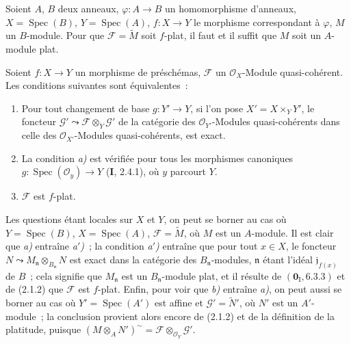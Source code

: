\begin{proposition}[2.1.2]
\label{IV.2.1.2-fr}
Soient $A$, $B$ deux anneaux, $\varphi:A\to B$ un homomorphisme d'anneaux,
$X=\operatorname{Spec}(B)$, $Y=\operatorname{Spec}(A)$, $f:X\to Y$ le
morphisme correspondant à $\varphi$, $M$ un $B$-module. Pour que
$\mathscr F=\widetilde M$ soit $f$-plat, il faut et il suffit que $M$ soit un
$A$-module plat.
\end{proposition}

\begin{proposition}[2.1.3]
\label{IV.2.1.3-fr}
Soient $f:X\to Y$ un morphisme de préschémas, $\mathscr F$ un
$\mathcal O_X$-Module quasi-cohérent. Les conditions suivantes sont
équivalentes~:
\begin{enumerate}
\item[\emph{a)}] Pour tout changement de base $g:Y'\to Y$, si l'on pose
$X'=X\times_Y Y'$, le foncteur
$\mathscr G'\leadsto\mathscr F\otimes_Y\mathscr G'$ de la catégorie des
$\mathcal O_{Y'}$-Modules quasi-cohérents dans celle des
$\mathcal O_{X'}$-Modules quasi-cohérents, est exact.
\item[\emph{a$'$)}] La condition \emph{a)} est vérifiée pour tous les
morphismes canoniques $g:\operatorname{Spec}(\mathcal O_y)\to Y$ \textup{(\textbf{I}, 2.4.1)},
où $y$ parcourt $Y$.
\item[\emph{b)}] $\mathscr F$ est $f$-plat.
\end{enumerate}
\end{proposition}

Les questions étant locales sur $X$ et $Y$, on peut se borner au cas où
$Y=\operatorname{Spec}(B)$, $X=\operatorname{Spec}(A)$,
$\mathscr F=\widetilde M$, où $M$ est un $A$-module. Il est clair que
\emph{a)} entraîne \emph{a$'$)}~; la condition \emph{a$'$)} entraîne que
pour tout $x\in X$, le foncteur $N\leadsto M_{\mathfrak n}\otimes_{B_{\mathfrak n}}N$
est exact dans la catégorie des $B_{\mathfrak n}$-modules, $\mathfrak n$
étant l'idéal $\mathfrak j_{f(x)}$ de $B$~; cela signifie que
$M_{\mathfrak n}$ est un $B_{\mathfrak n}$-module plat, et il résulte de
$(\mathbf{0}_{\mathrm I},6.3.3)$ et de (2.1.2) que $\mathscr F$ est $f$-plat. Enfin,
pour voir que \emph{b)} entraîne \emph{a)}, on peut aussi se borner au cas où
$Y'=\operatorname{Spec}(A')$ est affine et $\mathscr G'=\widetilde{N}'$, où
$N'$ est un $A'$-module~; la conclusion provient alors encore de (2.1.2) et
de la définition de la platitude, puisque
$(M\otimes_A N')^{\sim}=\mathscr F\otimes_{\mathcal O_Y}\mathscr G'$.

